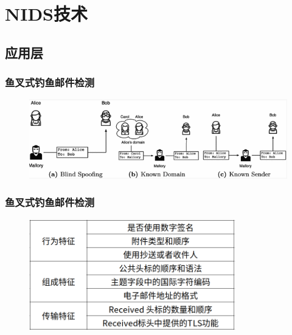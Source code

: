 \documentclass[12pt]{ctexbeamer}
\begin{document}
\section{NIDS技术}
\subsection{应用层}
\begin{frame}
  \frametitle{鱼叉式钓鱼邮件检测}
  	\begin{figure}
    	\includegraphics[width=1.0\textwidth]{figures/email_attack.png}
  	\end{figure}


\end{frame}



\begin{frame}
  \frametitle{鱼叉式钓鱼邮件检测}
  	\begin{figure}
    	\includegraphics[width=0.8\textwidth]{figures/email2.png}
  	\end{figure}


\end{frame}
\end{document}
